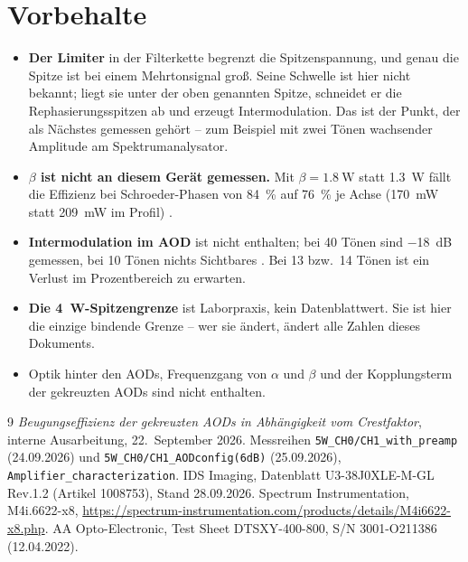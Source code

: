 \documentclass[11pt,a4paper]{article}
\begin{document}
\section{Vorbehalte}

\begin{itemize}
\item \textbf{Der Limiter} in der Filterkette begrenzt die Spitzenspannung,
  und genau die Spitze ist bei einem Mehrtonsignal groß. Seine Schwelle ist
  hier nicht bekannt; liegt sie unter der oben genannten Spitze, schneidet er
  die Rephasierungsspitzen ab und erzeugt Intermodulation. Das ist der
  Punkt, der als Nächstes gemessen gehört -- zum Beispiel mit zwei Tönen
  wachsender Amplitude am Spektrumanalysator.
\item \textbf{$\beta$ ist nicht an diesem Gerät gemessen.} Mit
  $\beta=\SI{1,8}{\watt}$ statt \SI{1,3}{\watt} fällt die Effizienz bei
  Schroeder-Phasen von \SI{84}{\percent} auf \SI{76}{\percent} je Achse
  (\SI{170}{\milli\watt} statt \SI{209}{\milli\watt} im Profil) \cite{beugung}.
\item \textbf{Intermodulation im AOD} ist nicht enthalten; bei 40 Tönen sind
  \SI{-18}{\deci\bel} gemessen, bei 10 Tönen nichts Sichtbares \cite{beugung}.
  Bei 13 bzw.\ 14 Tönen ist ein Verlust im Prozentbereich zu erwarten.
\item \textbf{Die \SI{4}{\watt}-Spitzengrenze} ist Laborpraxis, kein
  Datenblattwert. Sie ist hier die einzige bindende Grenze -- wer sie ändert,
  ändert alle Zahlen dieses Dokuments.
\item Optik hinter den AODs, Frequenzgang von $\alpha$ und $\beta$ und der
  Kopplungsterm der gekreuzten AODs sind nicht enthalten.
\end{itemize}

\begin{thebibliography}{9}
 \emph{Beugungseffizienz der gekreuzten AODs in Abhängigkeit
  vom Crestfaktor}, interne Ausarbeitung, 22.~September 2026.
 Messreihen \texttt{5W\_CH0/CH1\_with\_preamp} (24.09.2026) und
  \texttt{5W\_CH0/CH1\_AODconfig(6dB)} (25.09.2026),
  \texttt{Amplifier\_characterization}.
 IDS Imaging, Datenblatt U3-38J0XLE-M-GL Rev.1.2
  (Artikel 1008753), Stand 28.09.2026.
 Spectrum Instrumentation, M4i.6622-x8,
  \url{https://spectrum-instrumentation.com/products/details/M4i6622-x8.php}.
 AA Opto-Electronic, Test Sheet DTSXY-400-800, S/N
  3001-O211386 (12.04.2022).
\end{thebibliography}
\end{document}
